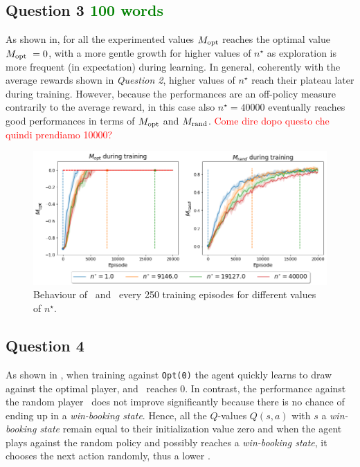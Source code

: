 \documentclass[10pt]{IEEEtran}
\begin{document}
\subsection*{Question 3  \textcolor{green}{100 words}}
As shown in, for all the experimented values $M_{\text{opt}}$ reaches the optimal value $M_{\text{opt}} \ = 0$, with a more gentle growth for higher values of $n^{\star}$ as exploration is more frequent (in expectation) during learning. In general, coherently with the average rewards shown in \emph{Question 2}, higher values of $n^{\star}$ reach their plateau later during training. However, because the performances are an off-policy measure contrarily to the average reward, in this case also $n^{\star} = 40000$ eventually reaches good performances in terms of $M_{\text{opt}}$ and $M_{\text{rand}}$.
\textcolor{red}{Come dire dopo questo che quindi prendiamo 10000?}
\begin{figure}[h]
    \centering
    \includegraphics[width=\linewidth]{code/figures/performance_n_star.png}
    \caption{Behaviour of \mopt\  and \mrand\  every 250 training episodes for different values of $n^{\star}$.}
    \label{plot_question3}
\end{figure}


\subsection*{Question 4}
As shown in , when training against \texttt{Opt(0)} the agent quickly learns to draw against the optimal player, and \mopt\  reaches 0. In contrast, the performance against the random player \mrand\  does not improve significantly because there is no chance of ending up in a \emph{win-booking state}. Hence, all the $Q$-values $Q(s, a)$ with $s$ a \emph{win-booking state} remain equal to their initialization value zero and when the agent plays against the random policy and possibly reaches a \emph{win-booking state}, it chooses the next action randomly, thus a lower \mrand. 
\end{document}
